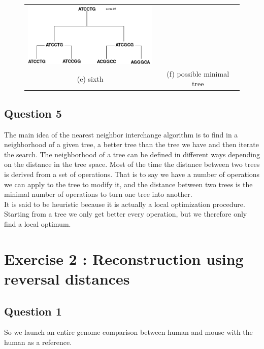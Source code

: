 \documentclass[]{article}
\theoremstyle{definition}
\begin{document}
\begin{figure}[h!]
\begin{tabular}{cc}
		\includegraphics*[width = 65mm]{image/final.png}\\
		(e) sixth & (f) possible minimal tree \\[6pt]
	\end{tabular}
\end{figure}



\subsection{Question 5}
The main idea of the nearest neighbor interchange algorithm is to find in a neighborhood of a given tree, a better tree than the tree we have and then iterate the search. The neighborhood of a tree can be defined in different ways depending on the distance in the tree space. Most of the time the distance between two trees is derived from a set of operations. That is to say we have a number of operations we can apply to the tree to modify it, and the distance between two trees is the minimal number of operations to turn one tree into another.\\
It is said to be heuristic because it is actually a local optimization procedure. Starting from a tree we only get better every operation, but we therefore only find a local optimum. 
\section{Exercise 2 : Reconstruction using reversal distances}
\subsection{Question 1}
So we launch an entire genome comparison between human and mouse with the human as a reference.
\end{document}

